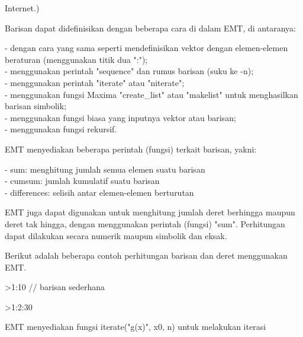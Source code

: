 \documentclass[a4paper,10pt]{article}
\begin{document}
\begin{eulernotebook}
\begin{eulercomment}
\begin{eulercomment}
\begin{eulercomment}
\begin{eulercomment}
\begin{eulercomment}
\begin{eulercomment}
\begin{eulercomment}
\begin{eulercomment}
\begin{eulercomment}
\begin{eulercomment}
\begin{eulercomment}
\begin{eulercomment}
\begin{eulercomment}
\begin{eulercomment}
\begin{eulercomment}
\begin{eulercomment}
\begin{eulercomment}
\begin{eulercomment}
\begin{eulercomment}
\begin{eulercomment}
\begin{eulercomment}
\begin{eulercomment}
\begin{eulercomment}
Internet.)

Barisan dapat didefinisikan dengan beberapa cara di dalam EMT, di
antaranya:

- dengan cara yang sama seperti mendefinisikan vektor dengan
elemen-elemen beraturan (menggunakan titik dua ":");\\
- menggunakan perintah "sequence" dan rumus barisan (suku ke -n);\\
- menggunakan perintah "iterate" atau "niterate";\\
- menggunakan fungsi Maxima "create\_list" atau "makelist" untuk
menghasilkan barisan simbolik;\\
- menggunakan fungsi biasa yang inputnya vektor atau barisan;\\
- menggunakan fungsi rekursif.

EMT menyediakan beberapa perintah (fungsi) terkait barisan, yakni:

- sum: menghitung jumlah semua elemen suatu barisan\\
- cumsum: jumlah kumulatif suatu barisan\\
- differences: selisih antar elemen-elemen berturutan

EMT juga dapat digunakan untuk menghitung jumlah deret berhingga
maupun deret tak hingga, dengan menggunakan perintah (fungsi) "sum".
Perhitungan dapat dilakukan secara numerik maupun simbolik dan eksak.

Berikut adalah beberapa contoh perhitungan barisan dan deret
menggunakan EMT.
\end{eulercomment}
\begin{eulerprompt}
>1:10 // barisan sederhana
\end{eulerprompt}
\begin{euleroutput}
  [1,  2,  3,  4,  5,  6,  7,  8,  9,  10]
\end{euleroutput}
\begin{eulerprompt}
>1:2:30
\end{eulerprompt}
\begin{euleroutput}
  [1,  3,  5,  7,  9,  11,  13,  15,  17,  19,  21,  23,  25,  27,  29]
\end{euleroutput}
\begin{eulercomment}
EMT menyediakan fungsi iterate("g(x)", x0, n) untuk melakukan iterasi


\end{eulercomment}
\end{eulercomment}
\end{eulercomment}
\end{eulercomment}
\end{eulercomment}
\end{eulercomment}
\end{eulercomment}
\end{eulercomment}
\end{eulercomment}
\end{eulercomment}
\end{eulercomment}
\end{eulercomment}
\end{eulercomment}
\end{eulercomment}
\end{eulercomment}
\end{eulercomment}
\end{eulercomment}
\end{eulercomment}
\end{eulercomment}
\end{eulercomment}
\end{eulercomment}
\end{eulercomment}
\end{eulercomment}
\end{eulernotebook}
\end{document}
